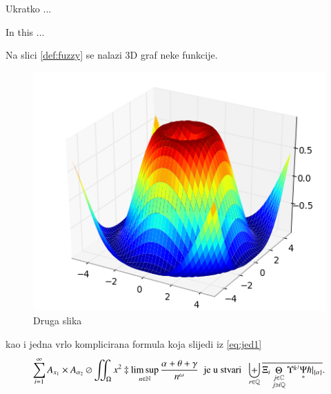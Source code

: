 \documentclass[a4paper,twoside,12pt]{memoir} %
\begin{document}


\pagestyle{empty} %


\begin{sazetak}
Ukratko ...
\end{sazetak}

\begin{summary}
In this ...
\end{summary}


\begin{cv}
Na slici \ref{def:fuzzy} se nalazi 3D graf neke funkcije. 

\begin{figure}[h!t]
\centering \includegraphics{surface3d.png}
\caption{Druga slika}
\label{fig:3d}
\end{figure}

kao i jedna vrlo komplicirana formula koja slijedi iz \eqref{eq:jed1}
\[ \sum_{i=1}^{\infty}A_{x_1}\times A_{{\alpha}_2}\oslash\iint_{\Omega}x^2\ddagger\limsup_{n\in\mathbb{N}}\frac{\alpha+\theta+\gamma}{n^{\omega}}\;\;\text{je u stvari}\;\;\biguplus_{r\in\mathbb{Q}}\overline{\Xi_i \mathop\Theta_{\substack{j\in\mathbb{C} \\ j\ni i\mathbb{Q}}} \Upsilon^{k^j} \underset{\ast}{\Psi} \hslash\vert_{\{\alpha\}}}.\]
\end{cv}
\end{document}
